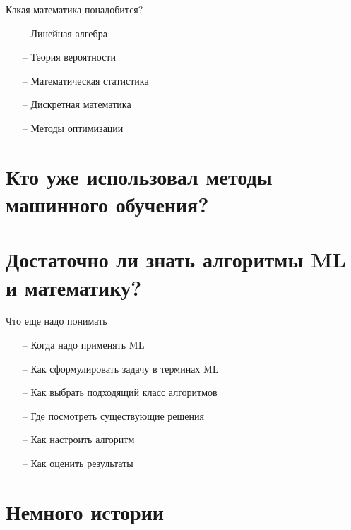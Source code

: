 \documentclass[10pt]{beamer}
\begin{document}
\begin{frame}{Какая математика понадобится?}
	\begin{itemize} [<+->]
	  \item[--] Линейная алгебра
	  \item[--] Теория вероятности
	  \item[--] Математическая статистика 
	  \item[--] Дискретная математика
	  	\item[--] Методы оптимизации 
	\end{itemize}
\end{frame}

\section{Кто уже использовал методы машинного обучения? }

\section{Достаточно ли знать алгоритмы ML и математику?}

\begin{frame}{Что еще надо понимать}
	\begin{itemize} [<+->]
	  \item[--] Когда надо применять ML
	  \item[--] Как сформулировать задачу в терминах ML
	  \item[--] Как выбрать подходящий класс алгоритмов
	  \item[--] Где посмотреть существующие решения
	  \item[--] Как настроить алгоритм
	  \item[--] Как оценить результаты
	\end{itemize}
\end{frame}

\section{Немного истории}
\end{document}

